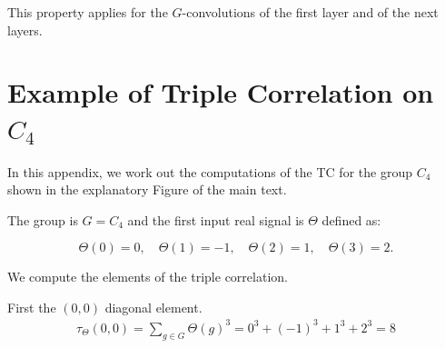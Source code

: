This property applies for the $G$-convolutions of the first layer and of the next layers.

\section{Example of Triple Correlation on $C_4$}

In this appendix, we work out the computations of the TC for the group $C_4$ shown in the explanatory Figure of the main text.

The group is $G = C_4$ and the first input real signal is $\Theta$ defined as:

\begin{equation}
    \Theta(0) = 0, \quad \Theta(1) = -1, \quad \Theta(2) = 1, \quad \Theta(3) = 2.
\end{equation}

We compute the elements of the triple correlation.

First the $(0, 0)$ diagonal element.
\scriptsize
\begin{align*}
    \tau_\Theta(0, 0)
    = \sum_{g \in G} \Theta(g)^3
    = 0^3 + (-1)^3 + 1^3 + 2^3
    = 8
\end{align*}

